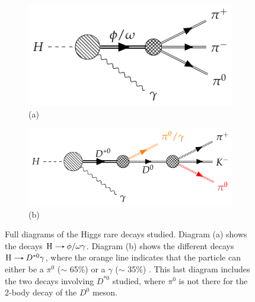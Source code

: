 \begin{figure}[!ht]
    \captionsetup[subfigure]{labelformat=empty}
    \vspace*{-0.2cm}
    \centering
    \setlength{\mylength}{\textwidth}
    \begin{subfigure}[t]{0.43\mylength}
            \centering
            \includegraphics[width=0.41764\mylength]{resources/H_rare_decays_diagrams/v1.pdf}%
            \caption{\footnotesize (a)}
    \end{subfigure}%
    \begin{subfigure}[t]{0.57\mylength}
            \centering
            \includegraphics[width=0.55236\mylength]{resources/H_rare_decays_diagrams/v2_1.pdf}%
            \caption{\footnotesize (b)}
    \end{subfigure}%
    \caption{Full diagrams of the Higgs rare decays studied. Diagram (a) shows the decays $\text{H}\protect\decaysto \phi/\omega\gamma$. Diagram (b) shows the different decays $\text{H}\protect\decaysto D^{*0}\gamma$, where the orange line indicates that the particle can either be a $\pi^{0}$ ($\sim$ 65\%) or a $\gamma$ ($\sim$ 35\%) \cite{PDG}. This last diagram includes the two decays involving $D^{*0}$ studied, where $\pi^{0}$ is not there for the 2-body decay of the $D^{0}$ meson.}
    \label{fig:Higgs_decays_studied}
    \vspace*{-0.0cm}
\end{figure}

